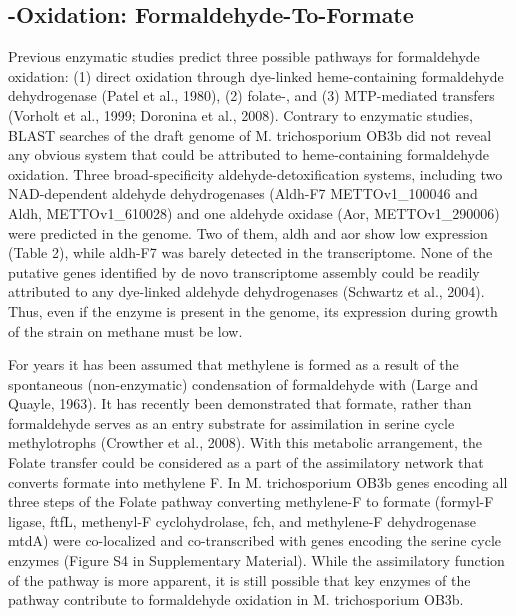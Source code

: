 \subsection{-Oxidation: Formaldehyde-To-Formate}
Previous enzymatic studies predict three possible pathways for formaldehyde oxidation: (1) direct oxidation through dye-linked heme-containing formaldehyde dehydrogenase (Patel et al., 1980), (2) folate-, and (3) MTP-mediated  transfers (Vorholt et al., 1999; Doronina et al., 2008).
Contrary to enzymatic studies, BLAST searches of the draft genome of M. trichosporium OB3b did not reveal any obvious system that could be attributed to heme-containing formaldehyde oxidation.
Three broad-specificity aldehyde-detoxification systems, including two NAD-dependent aldehyde dehydrogenases (Aldh-F7 METTOv1\_100046 and Aldh, METTOv1\_610028) and one aldehyde oxidase (Aor, METTOv1\_290006) were predicted in the genome.
Two of them, aldh and aor show low expression (Table 2), while aldh-F7 was barely detected in the transcriptome.
None of the putative genes identified by de novo transcriptome assembly could be readily attributed to any dye-linked aldehyde dehydrogenases (Schwartz et al., 2004).
Thus, even if the enzyme is present in the genome, its expression during growth of the strain on methane must be low.

For years it has been assumed that methylene  is formed as a result of the spontaneous (non-enzymatic) condensation of formaldehyde with  (Large and Quayle, 1963).
It has recently been demonstrated that formate, rather than formaldehyde serves as an entry substrate for assimilation in serine cycle methylotrophs (Crowther et al., 2008).
With this metabolic arrangement, the Folate  transfer could be considered as a part of the assimilatory network that converts formate into methylene F.
In M. trichosporium OB3b genes encoding all three steps of the Folate pathway converting methylene-F to formate (formyl-F ligase, ftfL, methenyl-F cyclohydrolase, fch, and methylene-F dehydrogenase mtdA) were co-localized and co-transcribed with genes encoding the serine cycle enzymes (Figure S4 in Supplementary Material).
While the assimilatory function of the pathway is more apparent, it is still possible that key enzymes of the pathway contribute to formaldehyde oxidation in M. trichosporium OB3b.

